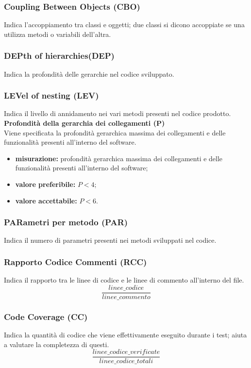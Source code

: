 \subsubsection{Coupling Between Objects (CBO)}
Indica l'accoppiamento tra classi e oggetti; due classi si dicono accoppiate se una utilizza metodi o variabili dell'altra.

\subsubsection{DEPth of hierarchies(DEP)}
Indica la profondità delle gerarchie nel codice sviluppato.

\subsubsection{LEVel of nesting (LEV)}
Indica il livello di annidamento nei vari metodi presenti nel codice prodotto.
\textbf{Profondità della gerarchia dei collegamenti (P)}\\
Viene specificata la profondità gerarchica massima dei collegamenti e delle funzionalità presenti all'interno del software.
\begin{itemize}
	\item \textbf{misurazione:} profondità gerarchica massima dei collegamenti e delle funzionalità presenti all'interno del software;
	\item \textbf{valore preferibile:} $P < 4$;
	\item \textbf{valore accettabile:} $P < 6$.
\end{itemize}

\subsubsection{PARametri per metodo (PAR)}
Indica il numero di parametri presenti nei metodi sviluppati nel codice.

\subsubsection{Rapporto Codice Commenti (RCC)}
Indica il rapporto tra le linee di codice e le linee di commento all'interno del file.
\[\frac{linee\_codice}{linee\_commento}\]

\subsubsection{Code Coverage (CC)}
Indica la quantità di codice che viene effettivamente eseguito durante i test; aiuta a valutare la completezza di questi.
\[\frac{linee\_codice\_verificate}{linee\_codice\_totali}\]

